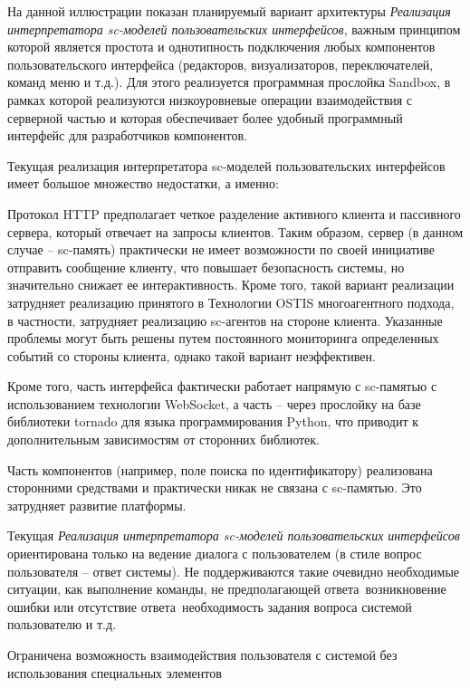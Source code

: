 \begin{scnitemize}
\begin{scnitemize}
На данной иллюстрации показан планируемый вариант архитектуры \textit{Реализация интерпретатора sc-моделей пользовательских
интерфейсов}, важным принципом которой является простота и однотипность подключения любых компонентов пользовательского
интерфейса (редакторов, визуализаторов, переключателей, команд меню и т.д.). Для этого реализуется программная прослойка
Sandbox, в рамках которой реализуются низкоуровневые операции взаимодействия с серверной частью и которая обеспечивает
более удобный программный интерфейс для разработчиков компонентов.

Текущая реализация интерпретатора sc-моделей пользовательских интерфейсов имеет большое множество недостатки, а именно:
\begin{scnitemize}
    \item Протокол HTTP предполагает четкое разделение активного клиента и пассивного сервера, который отвечает
    на запросы клиентов. Таким образом, сервер (в данном случае -- sc-память) практически не имеет возможности по
    своей инициативе отправить сообщение клиенту, что повышает безопасность системы, но значительно снижает ее
    интерактивность. Кроме того, такой вариант реализации затрудняет реализацию принятого в Технологии OSTIS
    многоагентного подхода, в частности, затрудняет реализацию sc-агентов на стороне клиента. Указанные проблемы
    могут быть решены путем постоянного мониторинга определенных событий со стороны клиента, однако такой вариант
    неэффективен.
    \item Кроме того, часть интерфейса фактически работает напрямую с sc-памятью с использованием технологии
    WebSocket, а часть -- через прослойку на базе библиотеки tornado для языка программирования Python,
    что приводит к дополнительным зависимостям от сторонних библиотек.
    \item Часть компонентов (например, поле поиска по идентификатору) реализована сторонними средствами и практически
    никак не связана с sc-памятью. Это затрудняет развитие платформы.
    \item Текущая \textit{Реализация интерпретатора sc-моделей пользовательских интерфейсов} ориентирована только на
    ведение диалога с пользователем (в стиле вопрос пользователя -- ответ системы). Не поддерживаются такие очевидно
    необходимые ситуации, как выполнение команды, не предполагающей ответа~возникновение ошибки или отсутствие
    ответа~необходимость задания вопроса системой пользователю и т.д.
    \item Ограничена возможность взаимодействия пользователя с системой без использования специальных элементов

\end{scnitemize}
\end{scnitemize}
\end{scnitemize}
